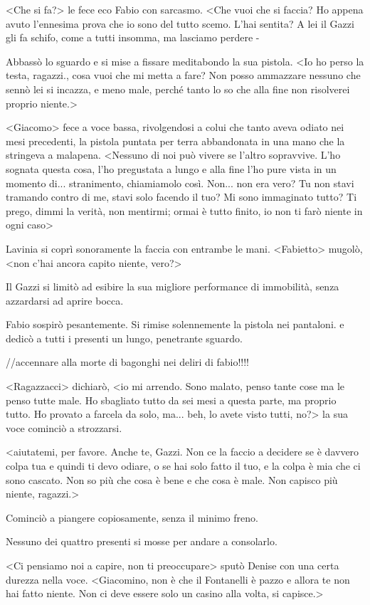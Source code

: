 <Che si fa?> le fece eco Fabio con sarcasmo. <Che vuoi che si faccia? Ho appena avuto l'ennesima prova che io sono del tutto scemo. L'hai sentita? A lei il Gazzi gli fa schifo, come a tutti insomma, ma lasciamo perdere -

Abbassò lo sguardo e si mise a fissare meditabondo la sua pistola. <Io ho perso la testa, ragazzi., cosa vuoi che mi metta a fare? Non posso ammazzare nessuno che sennò lei si incazza, e meno male, perché tanto lo so che alla fine non risolverei proprio niente.>

<Giacomo> fece a voce bassa, rivolgendosi a colui che tanto aveva odiato nei mesi precedenti, la pistola puntata per terra abbandonata in una mano che la stringeva a malapena. <Nessuno di noi può vivere se l'altro sopravvive. L'ho sognata questa cosa, l'ho pregustata a lungo e alla fine l'ho pure vista in un momento di... stranimento, chiamiamolo così. Non... non era vero? Tu non stavi tramando contro di me, stavi solo facendo il tuo? Mi sono immaginato tutto? Ti prego, dimmi la verità, non mentirmi; ormai è tutto finito, io non ti farò niente in ogni caso>

Lavinia si coprì sonoramente la faccia con entrambe le mani. <Fabietto> mugolò, <non c'hai ancora capito niente, vero?>

Il Gazzi si limitò ad esibire la sua migliore performance di immobilità, senza azzardarsi ad aprire bocca.

Fabio sospirò pesantemente. Si rimise solennemente la pistola nei pantaloni. e dedicò a tutti i presenti un lungo, penetrante sguardo.

//accennare alla morte di bagonghi nei deliri di fabio!!!!

<Ragazzacci> dichiarò, <io mi arrendo. Sono malato, penso tante cose ma le penso tutte male. Ho sbagliato tutto da sei mesi a questa parte, ma proprio tutto. Ho provato a farcela da solo, ma... beh, lo avete visto tutti, no?> la sua voce cominciò a strozzarsi.

<aiutatemi, per favore. Anche te, Gazzi. Non ce la faccio a decidere se è davvero colpa tua e quindi ti devo odiare, o se hai solo fatto il tuo, e la colpa è mia che ci sono cascato. Non so più che cosa è bene e che cosa è male. Non capisco più niente, ragazzi.>

Cominciò a piangere copiosamente, senza il minimo freno. 

Nessuno dei quattro presenti si mosse per andare a consolarlo.

<Ci pensiamo noi a capire, non ti preoccupare> sputò Denise con una certa durezza nella voce. <Giacomino, non è che il Fontanelli è pazzo e allora te non hai fatto niente. Non ci deve essere solo un casino alla volta, si capisce.>


